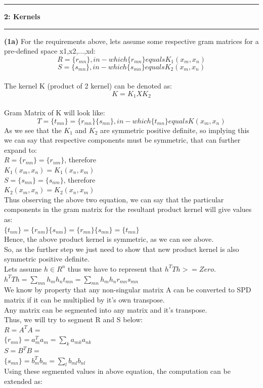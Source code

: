 \documentclass[11pt]{article}
\newcommand\question[2]{\vspace{.25in}\hrule\textbf{#1: #2}\vspace{.5em}\hrule\vspace{.10in}}
\renewcommand\part[1]{\vspace{.10in}\textbf{(#1)}}
\begin{document}
\question{2}{Kernels}

\part{1a} For the requirements above, lets assume some respective gram matrices for a pre-defined space x1,x2,...,xd:
\[ R = \{r_{mn}\}, in-which\{r_{mn}\} equals K_1(x_m, x_n) \] 
\[ S = \{s_{mn}\}, in-which\{s_{mn}\} equals K_2(x_m, x_n) \] \\
The kernel K (product of 2 kernel) can be denoted as:\\
\[K = K_1 X K_2\] \\
Gram Matrix of K will look like:
\[ T = \{t_{mn}\} = \{r_{mn}\}\{s_{mn}\}, in-which \{t_{mn}\}  equals K(x_m, x_n) \]
As we see that the $K_1$ and $K_2$ are symmetric positive definite, so implying this we can say that respective components must be symmetric, that can further expand to:\\ 

    $ R = \{r_{mn}\} = \{r_{nm}\}$, therefore\\ 
$ K_1(x_m, x_n) = K_1(x_n, x_m) $\\
    $ S = \{s_{mn}\} = \{s_{nm}\}$, therefore\\
 $ K_2(x_m, x_n) = K_2(x_n, x_m) $\\

Thus observing the above two equation, we can say that the particular components in the gram matrix for the resultant product kernel will give values as:\\
$ \{t_{nm}\} = \{r_{nm}\}\{s_{nm}\} = \{r_{mn}\}\{s_{mn}\} = \{t_{mn}\}  $\\
Hence, the above product kernel is symmetric, as we can see above.\\
So, as the further step we just need to show that new product kernel is also symmetric positive definite.\\
Lets assume $h \in R^n$ thus we have to represent that $h^TTh >= Zero$.\\ 
    
    $h^TTh = \sum_{mn} h_m h_n t_{mn} = \sum_{mn} h_m h_n r_{mn} s_{mn}$\\

We know by property that any non-singular matrix A can be converted to SPD matrix if it can be multiplied by it's own transpose.\\
Any matrix can be segmented into any matrix and it's transpose.\\
Thus, we will try to segment R and S below:\\ 
    $R = A^TA =$\\ $\{r_{mn}\} = a_{m}^Ta_m = \sum_{k} a_{mk}a_{nk} $\\
    $S = B^TB =$\\ $\{s_{mn}\} = b_{m}^Tb_m = \sum_{l} b_{ml}b_{nl} $\\
   Using these segmented values in above equation, the computation can be extended as:\\
 
\end{document}
